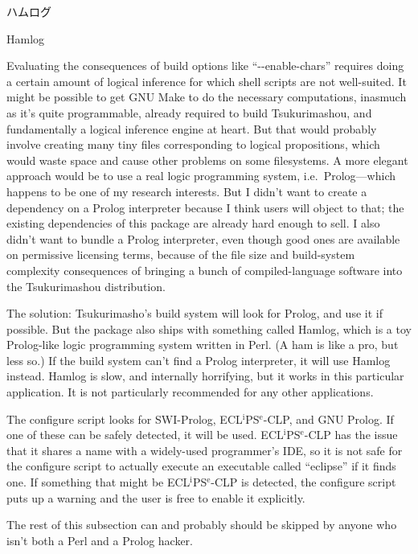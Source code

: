 \documentclass[14pt]{extarticle}
\newcommand{\blsubsection}[2]{%
\kaku\large#1\qquad\phantomsection%
\addcontentsline{toc}{subsection}{#1 #2}%
#2\par\addpenalty{-300}\normalsize}
\begin{document}

\blsubsection{ハムログ}{Hamlog}

Evaluating the consequences of build options like ``-{}-enable-chars''
requires doing a certain amount of logical inference for which shell scripts
are not well-suited.  It might be possible to get GNU Make to do the
necessary computations, inasmuch as it's quite programmable, already
required to build Tsukurimashou, and fundamentally a logical inference
engine at heart.  But that would probably involve creating many tiny files
corresponding to logical propositions, which would waste space and cause
other problems on some filesystems.  A more elegant approach would be to use
a real logic programming system, i.e.\ Prolog---which happens to be one of
my research interests.  But I didn't want to create a dependency on a Prolog
interpreter because I think users will object to that; the existing
dependencies of this package are already hard enough to sell.  I also didn't
want to bundle a Prolog interpreter, even though good ones are available on
permissive licensing terms, because of the file size and build-system
complexity consequences of bringing a bunch of compiled-language software
into the Tsukurimashou distribution.

The solution:  Tsukurimasho's build system will look for Prolog, and use it
if possible.  But the package also ships with something called Hamlog, which
is a toy Prolog-like logic programming system written in Perl.  (A ham
is like a pro, but less so.)  If the build system can't find a Prolog
interpreter, it will use Hamlog instead.  Hamlog is slow, and internally
horrifying, but it works in this particular application.  It is not
particularly recommended for any other applications.

The configure script looks for SWI-Prolog,
ECL$^\textrm{i}$PS$^\textrm{e}$-CLP, and GNU Prolog.  If one of these can be
safely detected, it will be used.  ECL$^\textrm{i}$PS$^\textrm{e}$-CLP has
the issue that it shares a name with a widely-used programmer's IDE, so it
is not safe for the configure script to actually execute an executable
called ``eclipse'' if it finds one.  If something that might be
ECL$^\textrm{i}$PS$^\textrm{e}$-CLP is detected, the configure script puts
up a warning and the user is free to enable it explicitly.

The rest of this subsection can and probably should be skipped by
anyone who isn't both a Perl and a Prolog hacker.
\end{document}

